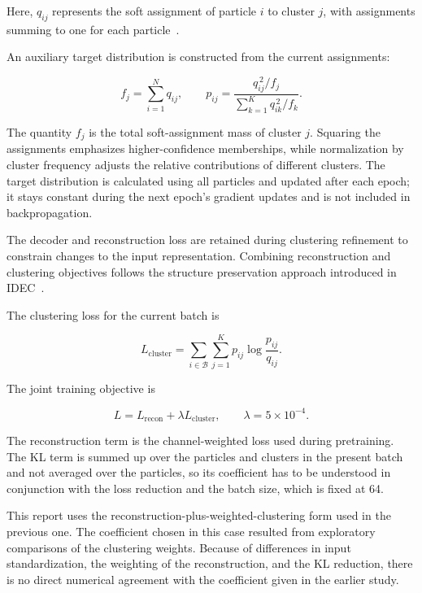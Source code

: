 Here, \(q_{ij}\) represents the soft assignment of particle \(i\) to cluster \(j\), with assignments summing to one for each particle~\cite{xie2016}.

An auxiliary target distribution is constructed from the current assignments:

\begin{equation} f_j=\sum_{i=1}^{N}q_{ij}, \qquad p_{ij} = \frac{q_{ij}^{\,2}/f_j} {\displaystyle\sum_{k=1}^{K}q_{ik}^{\,2}/f_k}. \end{equation}

The quantity \(f_j\) is the total soft-assignment mass of cluster \(j\). Squaring the assignments emphasizes higher-confidence memberships, while normalization by cluster frequency adjusts the relative contributions of different clusters. The target distribution is calculated using all particles and updated after each epoch; it stays constant during the next epoch's gradient updates and is not included in backpropagation.

The decoder and reconstruction loss are retained during clustering refinement to constrain changes to the input representation. Combining reconstruction and clustering objectives follows the structure preservation approach introduced in IDEC~\cite{guo2017}.

The clustering loss for the current batch is

\begin{equation} L_{\mathrm{cluster}} = \sum_{i\in\mathcal{B}} \sum_{j=1}^{K} p_{ij}\log\frac{p_{ij}}{q_{ij}}. \end{equation}

The joint training objective is

\begin{equation} L = L_{\mathrm{recon}} + \lambda L_{\mathrm{cluster}}, \qquad \lambda=5\times10^{-4}. \end{equation}

The reconstruction term is the channel-weighted loss used during pretraining. The KL term is summed up over the particles and clusters in the present batch and not averaged over the particles, so its coefficient has to be understood in conjunction with the loss reduction and the batch size, which is fixed at 64.

This report uses the reconstruction-plus-weighted-clustering form used in the previous one. The coefficient chosen in this case resulted from exploratory comparisons of the clustering weights. Because of differences in input standardization, the weighting of the reconstruction, and the KL reduction, there is no direct numerical agreement with the coefficient given in the earlier study.


